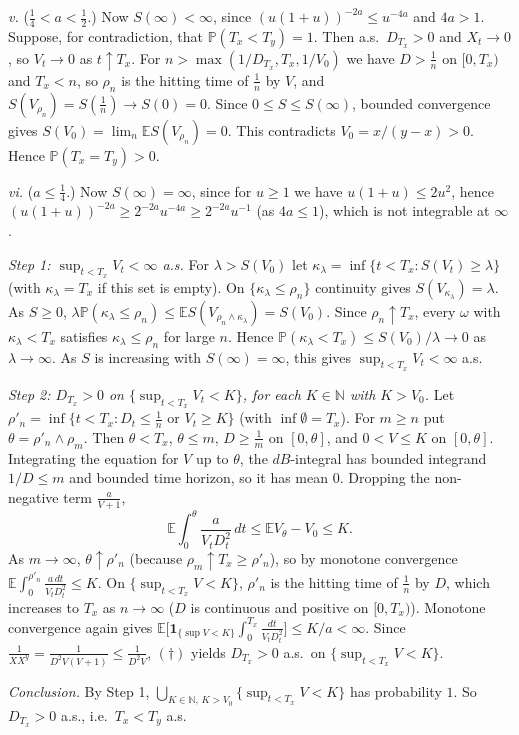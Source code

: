 \documentclass[11pt,a4paper]{article}
\newcommand{\E}{\mathbb{E}}
\renewcommand{\P}{\mathbb{P}}
\newcommand{\N}{\mathbb{N}}
\newcommand{\1}{\mathbf{1}}
\begin{document}
\emph{v.} ($\frac14<a<\frac12$.) Now $S(\infty)<\infty$, since $(u(1+u))^{-2a}\le u^{-4a}$ and $4a>1$. Suppose, for
contradiction, that $\P(T_x<T_y)=1$. Then a.s.\ $D_{T_x}>0$ and $X_t\to0$, so $V_t\to0$ as $t\uparrow T_x$. For
$n>\max(1/D_{T_x},T_x,1/V_0)$ we have $D>\frac1n$ on $[0,T_x)$ and $T_x<n$, so $\rho_n$ is the hitting time of $\frac1n$ by $V$,
and $S(V_{\rho_n})=S(\frac1n)\to S(0)=0$. Since $0\le S\le S(\infty)$, bounded convergence gives
$S(V_0)=\lim_n\E S(V_{\rho_n})=0$. This contradicts $V_0=x/(y-x)>0$. Hence $\P(T_x=T_y)>0$.

\emph{vi.} ($a\le\frac14$.) Now $S(\infty)=\infty$, since for $u\ge1$ we have $u(1+u)\le2u^2$, hence $(u(1+u))^{-2a}\ge2^{-2a}u^{-4a}\ge2^{-2a}u^{-1}$ (as $4a\le1$), which is not integrable at $\infty$.

\emph{Step 1: $\sup_{t<T_x}V_t<\infty$ a.s.} For $\lambda>S(V_0)$ let
$\kappa_\lambda=\inf\{t<T_x:S(V_t)\ge\lambda\}$ (with $\kappa_\lambda=T_x$ if this set is empty). On
$\{\kappa_\lambda\le\rho_n\}$ continuity gives $S(V_{\kappa_\lambda})=\lambda$. As $S\ge0$,
$\lambda\P(\kappa_\lambda\le\rho_n)\le\E S(V_{\rho_n\wedge\kappa_\lambda})=S(V_0)$. Since $\rho_n\uparrow T_x$, every
$\omega$ with $\kappa_\lambda<T_x$ satisfies $\kappa_\lambda\le\rho_n$ for large $n$. Hence
$\P(\kappa_\lambda<T_x)\le S(V_0)/\lambda\to0$ as $\lambda\to\infty$. As $S$ is increasing with $S(\infty)=\infty$, this
gives $\sup_{t<T_x}V_t<\infty$ a.s.

\emph{Step 2: $D_{T_x}>0$ on $\{\sup_{t<T_x}V_t<K\}$, for each $K\in\N$ with $K>V_0$.} Let
$\rho'_n=\inf\{t<T_x:D_t\le\frac1n\text{ or }V_t\ge K\}$ (with $\inf\emptyset=T_x$). For $m\ge n$ put
$\theta=\rho'_n\wedge\rho_m$. Then $\theta<T_x$, $\theta\le m$, $D\ge\frac1m$ on $[0,\theta]$, and $0<V\le K$ on
$[0,\theta]$. Integrating the equation for $V$ up to $\theta$, the $dB$-integral has bounded integrand $1/D\le m$ and
bounded time horizon, so it has mean $0$. Dropping the non-negative term $\frac a{V+1}$,
\[
\E\int_0^{\theta}\frac{a}{V_tD_t^2}\,dt\le\E V_\theta-V_0\le K .
\]
As $m\to\infty$, $\theta\uparrow\rho'_n$ (because $\rho_m\uparrow T_x\ge\rho'_n$), so by monotone convergence
$\E\int_0^{\rho'_n}\frac{a\,dt}{V_tD_t^2}\le K$. On $\{\sup_{t<T_x}V<K\}$, $\rho'_n$ is the hitting time of $\frac1n$ by $D$,
which increases to $T_x$ as $n\to\infty$ ($D$ is continuous and positive on $[0,T_x)$). Monotone convergence again
gives $\E\big[\1_{\{\sup V<K\}}\int_0^{T_x}\frac{dt}{V_tD_t^2}\big]\le K/a<\infty$. Since
$\frac{1}{XX^y}=\frac{1}{D^2V(V+1)}\le\frac{1}{D^2V}$, $(\dagger)$ yields $D_{T_x}>0$ a.s.\ on $\{\sup_{t<T_x}V<K\}$.

\emph{Conclusion.} By Step 1, $\bigcup_{K\in\N,\,K>V_0}\{\sup_{t<T_x}V<K\}$ has probability $1$. So $D_{T_x}>0$ a.s., i.e.\
$T_x<T_y$ a.s.
\end{document}
